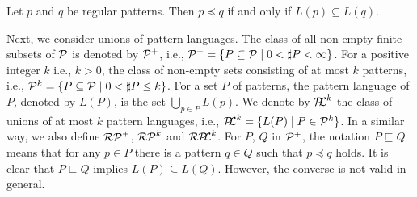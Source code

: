 \begin{lem}\label{regularPatternEquivalence}
  Let $p$ and $q$ be regular patterns.
  Then $p \preceq q$ if and only if $L(p) \subseteq L(q)$.
\end{lem}


Next, we consider unions of pattern languages. %
The class of all non-empty finite subsets of $\mathcal{P}$ is denoted by $\mathcal{P}^{+}$, i.e.,
$\mathcal{P}^{+} = \{P \subseteq \mathcal{P} \mid 0 < \sharp P < \infty\}$.
For a positive integer $k$ i.e., $k>0$, the class of non-empty sets consisting of at most $k$ patterns, i.e.,
$\mathcal{P}^{k} = \{P \subseteq \mathcal{P} \mid 0< \sharp P \leq k\}$.
For a set $P$ of patterns, the pattern language of $P$, denoted by $L(P)$, is the set $\bigcup_{p \in P}L(p)$.
We denote by $\mathcal{P\!\!L}^{k}$ the class of unions of at most $k$ pattern languages,
i.e., $\mathcal{P\!\!L}^{k} = \{L(P) \mid P \in \mathcal{P}^{k}\}$.
In a similar way, we also define $\mathcal{RP}^{+}$, $\mathcal{RP}^{k}$ and $\mathcal{RP\!\!L}^{k}$.
%
For $P$, $Q$ in $\mathcal{P}^{+}$,
the notation $P \sqsubseteq Q$ means that for any $p \in P$ there is a pattern $q \in Q$ such that $p \preceq q$ holds.
It is clear that $P \sqsubseteq Q$ implies $L(P) \subseteq L(Q)$.
However, the converse is not valid in general.

